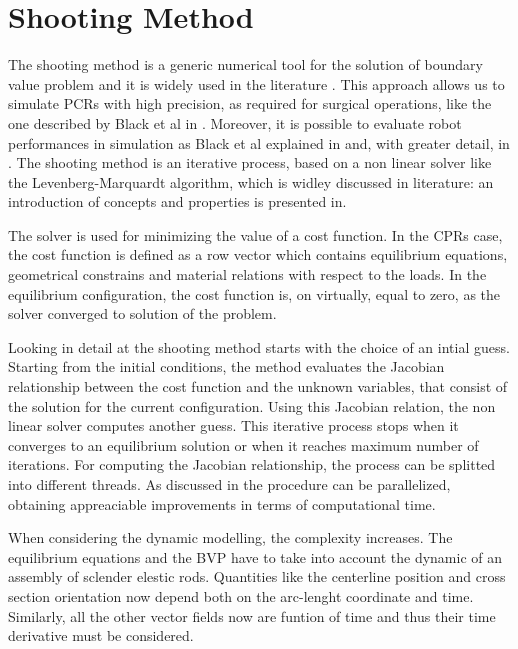 \documentclass{thesisreport}
\begin{document}
 \section{Shooting Method}
 The shooting method is a generic numerical tool for the solution of boundary value problem and it is widely used in the literature \cite{black_parallel_2018}\cite{black_modeling_2017}\cite{florian_geometrically_2020}. This approach allows us to simulate PCRs with high precision, as required for surgical operations, like the one described by Black et al in \cite{black_modeling_2017}. Moreover, it is possible to evaluate robot performances in simulation as Black et al explained in \cite{black_parallel_2018} and, with greater detail, in \cite{black_modeling_2017}. The shooting method is an iterative process, based on a non linear solver like the Levenberg-Marquardt algorithm, which is widley discussed in literature: an introduction of concepts and properties is presented in\cite{lourakis_brief_nodate}.
  
 The solver is used for minimizing the value of a cost function\cite{florian_geometrically_2020}. In the CPRs case, the cost function is defined as a row vector which contains equilibrium equations, geometrical constrains and material relations with respect to the loads. In the equilibrium configuration, the cost function is, on virtually, equal to zero, as the solver converged to solution of the problem. 
 
 Looking in detail at the shooting method starts with the choice of an intial guess. Starting from the initial conditions, the method evaluates the Jacobian relationship between the cost function and the unknown variables, that consist of the solution for the current configuration. Using this Jacobian relation, the non linear solver computes another guess. This iterative process stops when it converges to an equilibrium solution or when it reaches maximum number of iterations. For computing the Jacobian relationship, the process can be splitted into different threads. As discussed in \cite{till_efficient_2015} the procedure can be parallelized, obtaining appreaciable improvements in terms of computational time.  
 
 When considering the dynamic modelling, the complexity increases. The equilibrium equations and the BVP have to take into account the dynamic of an assembly of sclender elestic rods. Quantities like the centerline position and cross section orientation now depend both on the arc-lenght coordinate and time. Similarly, all the other vector fields now are funtion of time and thus their time derivative must be considered. 
 
\end{document}
